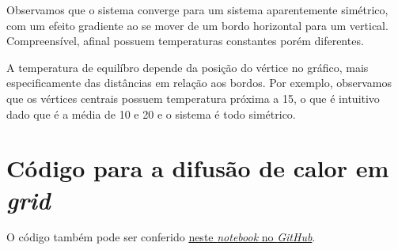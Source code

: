 \documentclass{article}
\begin{document}
\begin{itemize}
                Observamos que o sistema converge para um sistema aparentemente simétrico, com um efeito gradiente ao se mover
                de um bordo horizontal para um vertical. Compreensível, afinal possuem temperaturas constantes porém diferentes.

                A temperatura de equilíbro depende da posição do vértice no gráfico, mais especificamente das distâncias em relação aos bordos.
                Por exemplo, observamos que os vértices centrais possuem temperatura próxima a 15, o que é intuitivo dado que é a média de 10 e 20
                e o sistema é todo simétrico.

        \end{itemize}

    \appendix

    \section{Código para a difusão de calor em \textit{grid}}
        \label{appendix:a}

        O código também pode ser conferido \href{https://github.com/lucasresck/pde/blob/master/list_2/list_2.ipynb}{neste \textit{notebook} no \textit{GitHub}}.
\end{document}
